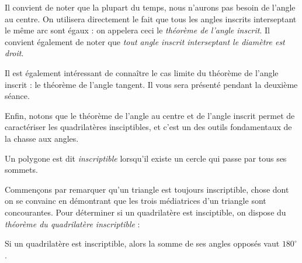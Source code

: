Il convient de noter que la plupart du temps, nous n'aurons pas besoin de l'angle au centre. On utilisera directement le fait que tous les angles inscrits interseptant le même arc sont égaux : on appelera ceci le \emph{théorème de l'angle inscrit}. Il convient également de noter que \emph{tout angle inscrit interseptant le diamètre est droit}.

Il est également intéressant de connaître le cas limite du théorème de l'angle inscrit : le théorème de l'angle tangent. Il vous sera présenté pendant la deuxième séance.

Enfin, notons que le théorème de l'angle au centre et de l'angle inscrit permet de caractériser les quadrilatères insciptibles, et c'est un des outils fondamentaux de la chasse aux angles.

\begin{dfn}
Un polygone est dit \emph{inscriptible} lorsqu'il existe un cercle qui passe par tous ses sommets.
\end{dfn}

Commençons par remarquer qu'un triangle est toujours inscriptible, chose dont on se convainc en démontrant que les trois médiatrices d'un triangle sont concourantes. Pour déterminer si un quadrilatère est insciptible, on dispose du \emph{théorème du quadrilatère inscriptible} :

\begin{thm}
Si un quadrilatère est inscriptible, alors la somme de ses angles opposés vaut $180^\circ$.
\end{thm}
\newline

